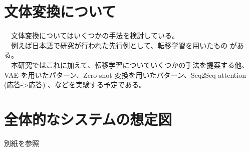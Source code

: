 \documentclass{scrartcl}
\begin{document}
\section{文体変換について}
\label{sec:org6a6190c}
　文体変換についてはいくつかの手法を検討している。\\
　例えば日本語で研究が行われた先行例として、転移学習を用いたもの \cite{stkn_tohoku} がある。\\
　本研究ではこれに加えて、転移学習についていくつかの手法を提案する他、VAE を用いたパターン、Zero-shot 変換を用いたパターン、Seq2Seq attention (応答->応答) 、などを実験する予定である。\\
\section{全体的なシステムの想定図}
\label{sec:org2aa07d0}
別紙を参照\\

\printbibliography[title=参考文献]
\end{document}
